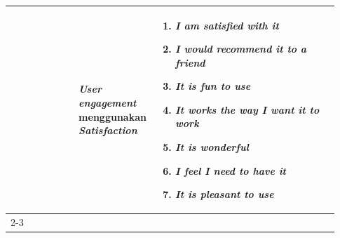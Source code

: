 \begin{longtable}{|p{0.2\linewidth}|p{0.2\linewidth}|p{0.53\linewidth}|}
                                                                  & \textbf{\textit{User engagement}} menggunakan \textbf{\textit{Satisfaction}}                                                                            & \begin{enumerate}[before=\vspace{-8pt}, leftmargin=*, nosep, series=US] \item \textit{I am satisfied with it} \item \textit{I would recommend it to a friend} \item \textit{It is fun to use} \item \textit{It works the way I want it to work} \item \textit{It is wonderful} \item \textit{I feel I need to have it} \item \textit{It is pleasant to use} \end{enumerate}                                                                                                                                                                                                                                                                                                                                                                                                                                                                                                                                                                                                                                                                                                                                                                                                                                                                                                                                                                                                                                                  \\
      \cline{2-3}
      \hline


\end{longtable}
